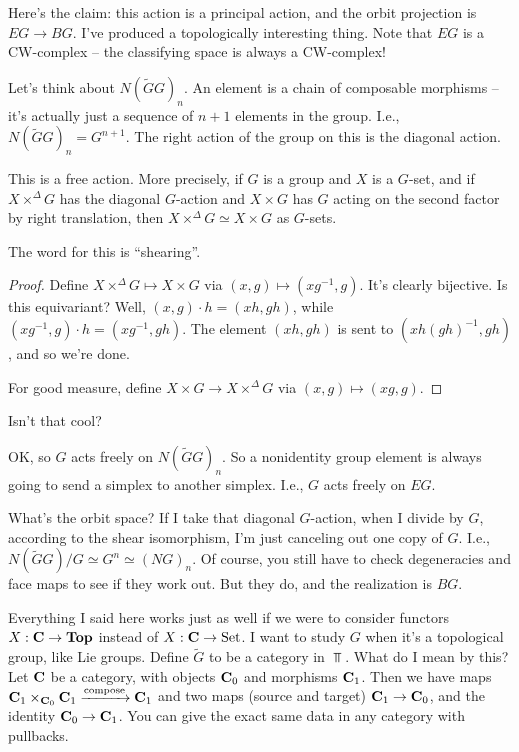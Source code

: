 Here's the claim: this action is a principal action, and the orbit projection is $EG\to BG$.
I've produced a topologically interesting thing.
Note that $EG$ is a CW-complex -- the classifying space is always a CW-complex!

Let's think about $N(\widetilde{G}G)_n$.
An element is a chain of composable morphisms -- it's actually just a sequence of $n+1$ elements in the group.
I.e., $N(\widetilde{G}G)_n = G^{n+1}$.
The right action of the group on this is the diagonal action.
\begin{lemma}
    This is a free action.
    More precisely, if $G$ is a group and $X$ is a $G$-set, and if $X\times^\Delta G$ has the diagonal $G$-action and $X\times G$ has $G$ acting on the second factor by right translation, then $X\times^\Delta G\simeq X\times G$ as $G$-sets.
\end{lemma}
The word for this is ``shearing''.
\begin{proof}
    Define $X\times^\Delta G\mapsto X\times G$ via $(x,g)\mapsto (xg^{-1},g)$.
    It's clearly bijective.
    Is this equivariant?
    Well, $(x,g)\cdot h = (xh, gh)$, while $(xg^{-1}, g) \cdot h = (xg^{-1}, gh)$.
    The element $(xh, gh)$ is sent to $(xh(gh)^{-1}, gh)$, and so we're done.
    
    For good measure, define $X\times G\to X\times^\Delta G$ via $(x,g)\mapsto (xg, g)$.
\end{proof}
Isn't that cool?

OK, so $G$ acts freely on $N(\widetilde{G}G)_n$.
So a nonidentity group element is always going to send a simplex to another simplex.
I.e., $G$ acts freely on $EG$.

What's the orbit space?
If I take that diagonal $G$-action, when I divide by $G$, according to the shear isomorphism, I'm just canceling out one copy of $G$.
I.e., $N(\widetilde{G} G)/G\simeq G^n\simeq (NG)_n$.
Of course, you still have to check degeneracies and face maps to see if they work out.
But they do, and the realization is $BG$.

Everything I said here works just as well if we were to consider functors $X:\mathbf C\to \mathbf{Top}$ instead of $X:\mathbf C\to \mathrm{Set}$.
I want to study $G$ when it's a topological group, like Lie groups.
Define $\widetilde{G}$ to be a category in $\Top$.
What do I mean by this?
Let $\mathbf C$ be a category, with objects $\mathbf C_0$ and morphisms $\mathbf C_1$.
Then we have maps $\mathbf C_1\times_{\mathbf C_0}\mathbf C_1\xrightarrow{\text{compose}}\mathbf C_1$ and two maps (source and target) $\mathbf C_1\to \mathbf C_0$, and the identity $\mathbf C_0\to\mathbf C_1$.
You can give the exact same data in any category with pullbacks.

